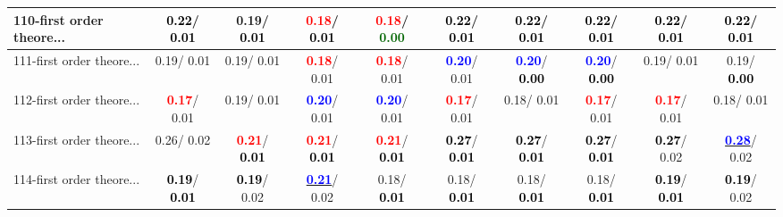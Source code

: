 \begin{table}[h]
\begin{center}
{\begin{tabular}{lc|c|c|c|c|c|c|c|c}
110-first order theore... & \textcolor{black}{\textbf{  0.22}}/\textcolor{black}{\textbf{  0.01}} &   0.19/\textcolor{black}{\textbf{  0.01}} & \textcolor{red}{\textbf{  0.18}}/\textcolor{black}{\textbf{  0.01}} & \textcolor{red}{\textbf{  0.18}}/\textcolor{darkgreen}{\textbf{  0.00}} & \textcolor{black}{\textbf{  0.22}}/\textcolor{black}{\textbf{  0.01}} & \textcolor{black}{\textbf{  0.22}}/\textcolor{black}{\textbf{  0.01}} & \textcolor{black}{\textbf{  0.22}}/\textcolor{black}{\textbf{  0.01}} & \textcolor{black}{\textbf{  0.22}}/\textcolor{black}{\textbf{  0.01}} & \textcolor{black}{\textbf{  0.22}}/\textcolor{black}{\textbf{  0.01}} \\ \hline
111-first order theore... &   0.19/  0.01 &   0.19/  0.01 & \textcolor{red}{\textbf{  0.18}}/  0.01 & \textcolor{red}{\textbf{  0.18}}/  0.01 & \textcolor{blue}{\textbf{  0.20}}/  0.01 & \textcolor{blue}{\textbf{  0.20}}/\textcolor{black}{\textbf{  0.00}} & \textcolor{blue}{\textbf{  0.20}}/\textcolor{black}{\textbf{  0.00}} &   0.19/  0.01 &   0.19/\textcolor{black}{\textbf{  0.00}} \\
112-first order theore... & \textcolor{red}{\textbf{  0.17}}/  0.01 &   0.19/  0.01 & \textcolor{blue}{\textbf{  0.20}}/  0.01 & \textcolor{blue}{\textbf{  0.20}}/  0.01 & \textcolor{red}{\textbf{  0.17}}/  0.01 &   0.18/  0.01 & \textcolor{red}{\textbf{  0.17}}/  0.01 & \textcolor{red}{\textbf{  0.17}}/  0.01 &   0.18/  0.01 \\
113-first order theore... &   0.26/  0.02 & \textcolor{red}{\textbf{  0.21}}/\textcolor{black}{\textbf{  0.01}} & \textcolor{red}{\textbf{  0.21}}/\textcolor{black}{\textbf{  0.01}} & \textcolor{red}{\textbf{  0.21}}/\textcolor{black}{\textbf{  0.01}} & \textcolor{black}{\textbf{  0.27}}/\textcolor{black}{\textbf{  0.01}} & \textcolor{black}{\textbf{  0.27}}/\textcolor{black}{\textbf{  0.01}} & \textcolor{black}{\textbf{  0.27}}/\textcolor{black}{\textbf{  0.01}} & \textcolor{black}{\textbf{  0.27}}/  0.02 & \underline{\textcolor{blue}{\textbf{  0.28}}}/  0.02 \\
114-first order theore... & \textcolor{black}{\textbf{  0.19}}/\textcolor{black}{\textbf{  0.01}} & \textcolor{black}{\textbf{  0.19}}/  0.02 & \underline{\textcolor{blue}{\textbf{  0.21}}}/  0.02 &   0.18/\textcolor{black}{\textbf{  0.01}} &   0.18/\textcolor{black}{\textbf{  0.01}} &   0.18/\textcolor{black}{\textbf{  0.01}} &   0.18/\textcolor{black}{\textbf{  0.01}} & \textcolor{black}{\textbf{  0.19}}/\textcolor{black}{\textbf{  0.01}} & \textcolor{black}{\textbf{  0.19}}/  0.02 \\

\end{tabular}}
\end{center}
\end{table}
